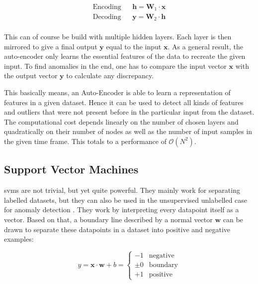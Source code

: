 \begin{align*}
\text{Encoding} & & \mathbf{h} = \mathbf{W}_1\cdot \mathbf{x} \\
\text{Decoding} & & \mathbf{y} = \mathbf{W}_2\cdot \mathbf{h} \\
\end{align*}
	
	This can of course be build with multiple hidden layers. Each layer is then mirrored to give a final output $\mathbf{y}$ equal to the input $\mathbf{x}$. As a general result, the auto-encoder only learns the essential features of the data to recreate the given input. \newline	
	To find anomalies in the end, one has to compare the input vector $\mathbf{x}$ with the output vector $\mathbf{y}$ to calculate any discrepancy.
	
	This basically means, an Auto-Encoder is able to learn a representation of features in a given dataset. Hence it can be used to detect all kinds of features and outliers that were not present before in the particular input from the dataset.
	The computational cost depends linearly on the number of chosen layers and quadratically on their number of nodes as well as the number of input samples in the given time frame. This totals to a performance of $\mathcal{O} (N^2)$.
	
	\subsection{Support Vector Machines}
	\acfp{svm} \cite[p. 744ff]{ai-modern} are not trivial, but yet quite powerful. They mainly work for separating labelled datasets, but they can also be used in the unsupervised unlabelled case for anomaly detection \cite{one-class-svm}. They work by interpreting every datapoint itself as a vector. Based on that, a boundary line described by a normal vector $\mathbf{w}$ can be drawn to separate these datapoints in a dataset into positive and negative examples:
	
	\begin{equation*}
	y = \mathbf{x}\cdot\mathbf{w} + b = \begin{cases}
	-1 & \text{negative} \\
	\pm 0 & \text{boundary} \\
	+1 & \text{positive} 
	\end{cases}
	\end{equation*}
	
